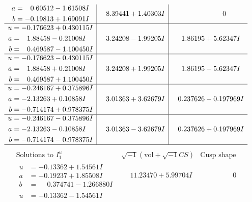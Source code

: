 \documentclass[1p]{elsarticle_modified}
\theoremstyle{definition}
\newcommand{\I}{\sqrt{-1}}
\begin{document}
$$\begin{array}{c|c|c}
\begin{aligned}
a &= \phantom{-}0.60512 - 1.61508 I \\
b &= -0.19813 + 1.69091 I\end{aligned}
 & \phantom{-}8.39441 + 1.40303 I & \phantom{-0.000000 } 0 \\ \hline\begin{aligned}
u &= -0.176623 + 0.430115 I \\
a &= \phantom{-}1.88458 - 0.21008 I \\
b &= \phantom{-}0.469587 - 1.100450 I\end{aligned}
 & \phantom{-}3.24208 - 1.99205 I & \phantom{-}1.86195 + 5.62347 I \\ \hline\begin{aligned}
u &= -0.176623 - 0.430115 I \\
a &= \phantom{-}1.88458 + 0.21008 I \\
b &= \phantom{-}0.469587 + 1.100450 I\end{aligned}
 & \phantom{-}3.24208 + 1.99205 I & \phantom{-}1.86195 - 5.62347 I \\ \hline\begin{aligned}
u &= -0.246167 + 0.375896 I \\
a &= -2.13263 + 0.10858 I \\
b &= -0.714174 + 0.978375 I\end{aligned}
 & \phantom{-}3.01363 + 3.62679 I & \phantom{-}0.237626 - 0.197969 I \\ \hline\begin{aligned}
u &= -0.246167 - 0.375896 I \\
a &= -2.13263 - 0.10858 I \\
b &= -0.714174 - 0.978375 I\end{aligned}
 & \phantom{-}3.01363 - 3.62679 I & \phantom{-}0.237626 + 0.197969 I\\
 \hline 
 \end{array}$$\newpage$$\begin{array}{c|c|c}  
\text{Solutions to }I^u_{1}& \I (\text{vol} + \sqrt{-1}CS) & \text{Cusp shape}\\
 \hline 
\begin{aligned}
u &= -0.13362 + 1.54561 I \\
a &= -0.19237 + 1.85508 I \\
b &= \phantom{-}0.374741 - 1.266880 I\end{aligned}
 & \phantom{-}11.23470 + 5.99704 I & \phantom{-0.000000 } 0 \\ \hline\begin{aligned}
u &= -0.13362 - 1.54561 I \\

\end{aligned}
\end{array}$$
\end{document}
